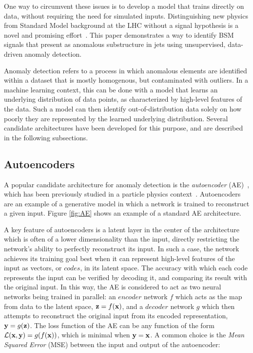 \documentclass[11pt, a4paper]{article}
\begin{document}
One way to circumvent these issues is to develop a model that trains directly on data, without requiring the need for simulated inputs.
Distinguishing new physics from Standard Model background at the LHC without a signal hypothesis is a novel and promising effort~\cite{Heimel_2019, deepAutoencoders, CWoLa, cheng2021variational}. 
This paper demonstrates a way to identify BSM signals that present as anomalous substructure in jets using unsupervised, data-driven anomaly detection. 

Anomaly detection refers to a process in which anomalous elements are identified within a dataset that is mostly homogenous, but contaminated with outliers. 
In a machine learning context, this can be done with a model that learns an underlying distribution of data points, as characterized by high-level features of the data. 
Such a model can then identify out-of-distribution data solely on how poorly they are represented by the learned underlying distribution. 
Several candidate architectures have been developed for this purpose, and are described in the following subsections.


\subsection{Autoencoders}

A popular candidate architecture for anomaly detection is the \textit{autoencoder} 
(AE)~\cite{bank2020autoencoders}, which has been previously studied in a particle physics context~\cite{Farina_2020, Heimel_2019}.
Autoencoders are an example of a generative model in which a network is trained to reconstruct a given input. 
Figure \ref{fig:AE} shows an example of a standard AE architecture.

A key feature of autoencoders is a latent layer in the center of the architecture which is often of a lower dimensionality than the input, directly restricting the network's ability to perfectly reconstruct its input. 
In such a case, the network achieves its training goal best when it can represent high-level features of the input as vectors, or $codes$, in its latent space. 
The accuracy with which each code represents the input can be verified by decoding it, and comparing its result with the original input. 
In this way, the AE is considered to act as two neural networks being trained in parallel: an $encoder$ network $f$
which acts as the map from data to the latent space, ${\textbf z}=f({\textbf x})$, and
a $decoder$ network $g$ which then attempts to reconstruct the original input from 
its encoded representation, ${\textbf y}=g({\textbf z})$. 
The loss function of the AE can be any function of the form $\mathcal{L}({\textbf x}, {\textbf y})=g(f({\textbf x}))$, which 
is minimal when ${\textbf y}={\textbf x}$. 
A common choice is the {\it Mean Squared Error} (MSE)
between the input and output of the autoencoder:
\end{document}
